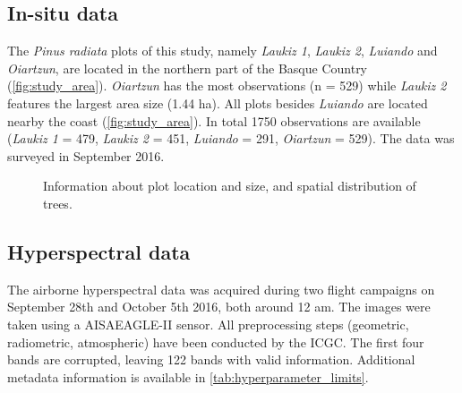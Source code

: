 \documentclass[review]{elsarticle}
\begin{document}
\subsection{In-situ data}

\noindent The \textit{Pinus radiata} plots of this study, namely \textit{Laukiz 1}, \textit{Laukiz 2}, \textit{Luiando} and \textit{Oiartzun}, are located in the northern part of the Basque Country (\autoref{fig:study_area}).
\textit{Oiartzun} has the most observations (n = 529) while \textit{Laukiz 2} features the largest area size (1.44 ha).
All plots besides \textit{Luiando} are located nearby the coast (\autoref{fig:study_area}).
In total 1750 observations are available (\textit{Laukiz 1} = 479, \textit{Laukiz 2} = 451, \textit{Luiando} = 291, \textit{Oiartzun} = 529).
The data was surveyed in September 2016.

\begin{figure} [t!]
\begin{center}
\caption{Information about plot location and size, and spatial distribution of trees.}
\label{fig:study_area}
\end{center}
\end{figure}


\subsection{Hyperspectral data}

\noindent The airborne hyperspectral data was acquired during two flight campaigns on September 28th and October 5th 2016, both around 12 am.
The images were taken using a AISAEAGLE-II sensor.
All preprocessing steps (geometric, radiometric, atmospheric) have been conducted by the \ac{ICGC}.
The first four bands are corrupted, leaving 122 bands with valid information.
Additional metadata information is available in \autoref{tab:hyperparameter_limits}.
\end{document}
